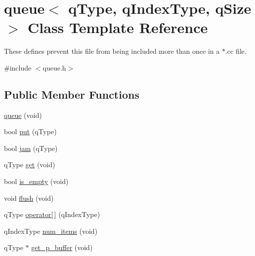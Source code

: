 \hypertarget{classqueue}{\section{queue$<$ q\-Type, q\-Index\-Type, q\-Size $>$ Class Template Reference}
\label{classqueue}
}


These defines prevent this file from being included more than once in a $\ast$.cc file.  




{\ttfamily \#include $<$queue.\-h$>$}

\subsection*{Public Member Functions}
\begin{DoxyCompactItemize}
\item 
\hyperlink{classqueue_ad73bf015e33248a17a65e74527101064}{queue} (void)
\item 
bool \hyperlink{classqueue_a29534e4b988018c118ea03d585a2ccca}{put} (q\-Type)
\item 
bool \hyperlink{classqueue_a83554d89bcad8366782e6bae02f4d964}{jam} (q\-Type)
\item 
q\-Type \hyperlink{classqueue_a7bc7735524e848e7903f7165bf3bc418}{get} (void)
\item 
bool \hyperlink{classqueue_a6305647b7ce548efd984108695427a12}{is\-\_\-empty} (void)
\item 
void \hyperlink{classqueue_a005e021f06134d7749eda7738fa8d17e}{flush} (void)
\item 
q\-Type \hyperlink{classqueue_a16c94746931572c15682e17310b3d4b8}{operator\mbox{[}$\,$\mbox{]}} (q\-Index\-Type)
\item 
q\-Index\-Type \hyperlink{classqueue_a8b0ca332f166b4909213d0d95fa8cdd2}{num\-\_\-items} (void)
\item 
q\-Type $\ast$ \hyperlink{classqueue_a393e29cfe2c12a91c02feaa796b0c363}{get\-\_\-p\-\_\-buffer} (void)
\end{DoxyCompactItemize}
